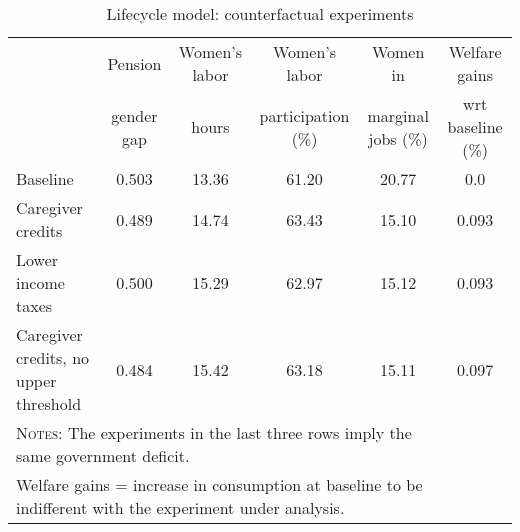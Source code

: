 \begin{table}[htbp]\caption{Lifecycle model: counterfactual experiments}\label{table:experiments}\centering\footnotesize\begin{tabular}{lccccc} \toprule & Pension & Women's labor & Women's labor & Women in &  Welfare gains  \\&gender gap &hours &  participation  (\%) & marginal jobs (\%)  & wrt baseline (\%)  \\\midrule    Baseline                                   &0.503&13.36&61.20&20.77& 0.0\\ Caregiver credits                          &0.489&14.74&63.43&15.10&0.093\\ Lower income taxes                         &0.500&15.29&62.97&15.12&0.093\\ Caregiver credits, no upper threshold      &0.484&15.42&63.18&15.11&0.097\\ \bottomrule\multicolumn{5}{l}{\textsc{Notes:} The experiments in the last three rows imply the same government deficit.}\\\multicolumn{5}{l}{Welfare gains = increase in consumption at baseline to be indifferent with the experiment under analysis. }\end{tabular}
      \end{table}